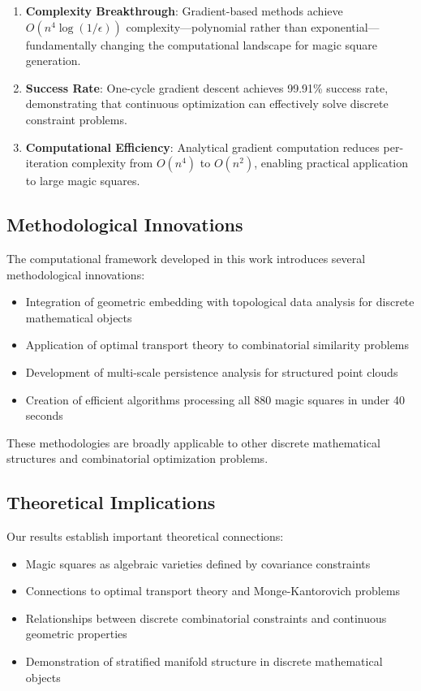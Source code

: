 \begin{enumerate}
    \item \textbf{Complexity Breakthrough}: Gradient-based methods achieve $O(n^4 \log(1/\epsilon))$ complexity—polynomial rather than exponential—fundamentally changing the computational landscape for magic square generation.
    
    \item \textbf{Success Rate}: One-cycle gradient descent achieves 99.91\% success rate, demonstrating that continuous optimization can effectively solve discrete constraint problems.
    
    \item \textbf{Computational Efficiency}: Analytical gradient computation reduces per-iteration complexity from $O(n^4)$ to $O(n^2)$, enabling practical application to large magic squares.
\end{enumerate}

\subsection{Methodological Innovations}

The computational framework developed in this work introduces several methodological innovations:

\begin{itemize}
    \item Integration of geometric embedding with topological data analysis for discrete mathematical objects
    \item Application of optimal transport theory to combinatorial similarity problems
    \item Development of multi-scale persistence analysis for structured point clouds
    \item Creation of efficient algorithms processing all 880 magic squares in under 40 seconds
\end{itemize}

These methodologies are broadly applicable to other discrete mathematical structures and combinatorial optimization problems.

\subsection{Theoretical Implications}

Our results establish important theoretical connections:

\begin{itemize}
    \item Magic squares as algebraic varieties defined by covariance constraints
    \item Connections to optimal transport theory and Monge-Kantorovich problems
    \item Relationships between discrete combinatorial constraints and continuous geometric properties
    \item Demonstration of stratified manifold structure in discrete mathematical objects
\end{itemize}

